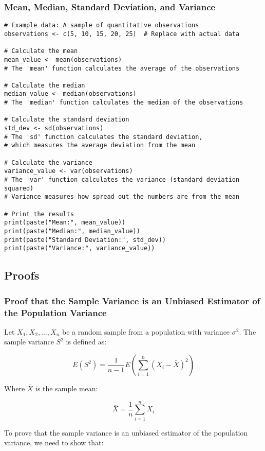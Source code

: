 \documentclass{article}
\begin{document}
\subsubsection*{Mean, Median, Standard Deviation, and Variance}

\begin{lstlisting}
# Example data: A sample of quantitative observations
observations <- c(5, 10, 15, 20, 25)  # Replace with actual data

# Calculate the mean
mean_value <- mean(observations)
# The 'mean' function calculates the average of the observations

# Calculate the median
median_value <- median(observations)
# The 'median' function calculates the median of the observations

# Calculate the standard deviation
std_dev <- sd(observations)
# The 'sd' function calculates the standard deviation, 
# which measures the average deviation from the mean

# Calculate the variance
variance_value <- var(observations)
# The 'var' function calculates the variance (standard deviation squared)
# Variance measures how spread out the numbers are from the mean

# Print the results
print(paste("Mean:", mean_value))
print(paste("Median:", median_value))
print(paste("Standard Deviation:", std_dev))
print(paste("Variance:", variance_value))
\end{lstlisting}

\pagebreak

\subsection{Proofs}
\subsubsection*{Proof that the Sample Variance is an Unbiased Estimator of the Population Variance}
Let $X_1, X_2, \ldots, X_n$ be a random sample from a population with variance $\sigma^2$. The sample variance $S^2$ is defined as:

\[
E(S^2) = \frac{1}{n-1} E(\sum_{i=1}^{n} (X_i - \bar{X})^2)
\]

Where $\bar{X}$ is the sample mean:

\[
\bar{X} = \frac{1}{n} \sum_{i=1}^{n} X_i
\]

To prove that the sample variance is an unbiased estimator of the population variance, we need to show that:
\end{document}
